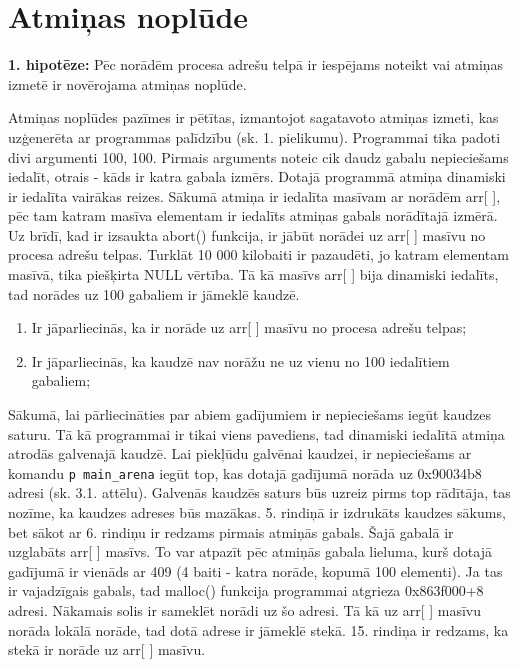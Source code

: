 ﻿
\section{Atmiņas noplūde}
 


\textbf{1. hipotēze:} Pēc norādēm procesa adrešu telpā ir iespējams noteikt vai atmiņas izmetē ir novērojama atmiņas noplūde.

Atmiņas noplūdes pazīmes ir pētītas, izmantojot sagatavoto atmiņas izmeti, kas uzģenerēta ar programmas palīdzību (sk. 1. pielikumu).
Programmai tika padoti divi argumenti 100, 100.
Pirmais arguments noteic cik daudz gabalu nepieciešams iedalīt, otrais - kāds ir katra gabala izmērs.
Dotajā programmā atmiņa dinamiski ir iedalīta vairākas reizes. 
Sākumā atmiņa ir iedalīta masīvam ar norādēm arr[ ], pēc tam katram masīva elementam ir iedalīts atmiņas gabals norādītajā izmērā.
Uz brīdī, kad ir izsaukta abort() funkcija, ir jābūt norādei uz arr[ ] masīvu no procesa adrešu telpas.
Turklāt 10 000 kilobaiti ir pazaudēti, jo  katram elementam masīvā, tika piešķirta NULL vērtība. 
Tā kā masīvs arr[ ] bija dinamiski iedalīts, tad norādes uz 100 gabaliem ir jāmeklē kaudzē.
\begin{enumerate}
\item Ir jāparliecinās, ka ir norāde uz arr[ ] masīvu no procesa adrešu telpas;
\item Ir jāparliecinās, ka kaudzē nav norāžu ne uz vienu no 100 iedalītiem gabaliem;
\end{enumerate}

Sākumā, lai pārliecināties par abiem gadījumiem ir nepieciešams iegūt kaudzes saturu.
Tā kā programmai ir tikai viens pavediens, tad dinamiski iedalītā atmiņa atrodās galvenajā kaudzē.
Lai piekļūdu galvēnai kaudzei, ir nepieciešams ar komandu \texttt{p main\_arena} iegūt top, kas dotajā gadījumā norāda uz 0x90034b8 adresi (sk. 3.1. attēlu). 
Galvenās kaudzēs saturs būs uzreiz pirms top rādītāja, tas nozīme, ka kaudzes adreses būs mazākas.
5. rindiņā ir izdrukāts kaudzes sākums, bet sākot ar 6. rindiņu ir redzams pirmais atmiņās gabals. 
Šajā gabalā ir uzglabāts arr[ ] masīvs. To var atpazīt pēc atmiņās gabala lieluma, kurš dotajā gadījumā ir vienāds ar 409 (4 baiti - katra norāde, kopumā 100 elementi).
Ja tas ir vajadzīgais gabals, tad malloc() funkcija programmai atgrieza 0x863f000+8 adresi.
Nākamais solis ir sameklēt norādi uz šo adresi.
Tā kā uz arr[ ] masīvu norāda lokālā norāde, tad dotā adrese ir jāmeklē stekā.
15. rindiņa ir redzams, ka stekā ir norāde uz arr[ ] masīvu.

